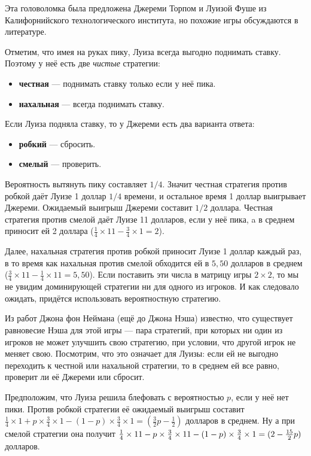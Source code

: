Эта головоломка была предложена Джереми Торпом и Луизой Фуше из Калифорнийского технологического института, но похожие игры обсуждаются в литературе.

Отметим, что имея на руках пику, Луиза всегда выгодно поднимать ставку.
Поэтому у неё есть две \emph{чистые} стратегии:
\begin{itemize}
 \item \textbf{честная} --- поднимать ставку только если у неё пика.
 \item \textbf{нахальная} --- всегда поднимать ставку.
\end{itemize}
Если Луиза подняла ставку, то у Джереми есть два варианта ответа:
\begin{itemize}
 \item \textbf{робкий} --- сбросить.
 \item \textbf{смелый} --- проверить.
\end{itemize}

Вероятность вытянуть пику составляет $1/4$.
Значит честная стратегия против робкой даёт Луизе 1 доллар $1/4$ времени, и остальное время 1 доллар выигрывает Джереми.
Ожидаемый выигрыш Джереми составит $1/2$ доллара.
Честная стратегия против смелой даёт Луизе 11 долларов, если у неё пика,
a в среднем приносит ей 2 доллара ($\tfrac14 \times 11 - \tfrac 34 \times 1 = 2$).

Далее, нахальная стратегия против робкой приносит Луизе 1 доллар каждый раз,
в то время как нахальная против смелой обходится ей в $5{,}50$ долларов в среднем ($\tfrac34 \times 11- \tfrac14 \times11 = 5{,}50$).
Если поставить эти числа в матрицу игры $2 \times 2$,
то мы не увидим доминирующей стратегии ни для одного из игроков.
И как следовало ожидать, придётся использовать вероятностную стратегию.

Из работ Джона фон Неймана (ещё до Джона Нэша) известно, что существует равновесие Нэша для этой игры --- пара стратегий, при которых ни один из игроков не может улучшить свою стратегию, при условии, что другой игрок не меняет свою.
Посмотрим, что это означает для Луизы: если ей не выгодно переходить к честной или нахальной стратегии, то в среднем ей все равно, проверит ли её Джереми или сбросит.

Предположим, что Луиза решила блефовать с вероятностью $p$, если у неё нет пики.
Против робкой стратегии её ожидаемый выигрыш составит $\tfrac14 \times 1 + p \times \tfrac34 \times 1 - (1 - p) \times \tfrac34 \times 1 =(\tfrac32p - \tfrac12)$ долларов в среднем.
Ну а при смелой стратегии она получит $\tfrac14 \times 11 - p \times \tfrac34 \times 11 - (1 - p) \times \tfrac34 \times 1 \z= (2 - \tfrac{15}2p)$ долларов.


